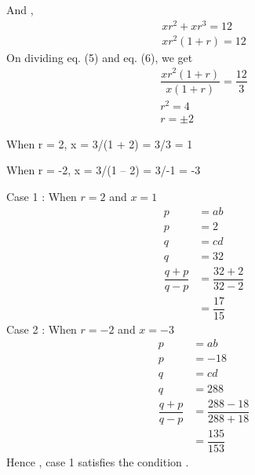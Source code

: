 \documentclass[journal,12pt,twocolumn]{IEEEtran}
\theoremstyle{remark}
\begin{document}
 And ,
 \begin{align}
xr^{2} + xr^{3} = 12 \\
xr^{2}(1+r) = 12
\end{align}
On dividing eq. (5) and eq. (6), we get
\begin{align}
\dfrac{xr^{2}(1+r)}{x(1+r)} = \dfrac{12}{3} \\
r^{2} = 4 \\
r = \pm2
\end{align}

When r = 2, x = 3/(1 + 2) = 3/3 = 1

When r = -2, x = 3/(1 – 2) = 3/-1 = -3

\vspace{0.5cm}
Case 1 :
When $r = 2$ and $x = 1$ \\
\begin{align}
p &= ab \\
p&=2 \\
q&= cd \\
q&=32 \\
\dfrac{q+p}{q-p} &= \dfrac{32 + 2}{32 - 2} \\
&=\dfrac{17}{15}
\end{align}
Case 2 :
When $r = -2$ and $x = -3$ \\
\begin{align}
p &= ab \\
p&=-18 \\
q&= cd \\
q&=288 \\
\dfrac{q+p}{q-p} &= \dfrac{288-18}{288+18} \\
&=\dfrac{135}{153}
\end{align}
Hence , case 1 satisfies the condition .
\end{document}
